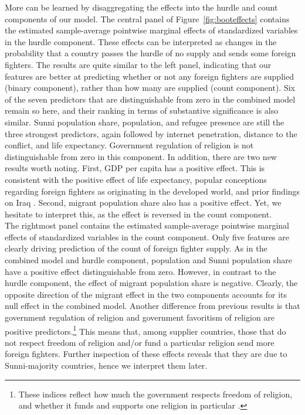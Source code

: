 \documentclass[12pt]{article}
\begin{document}
More can be learned by disaggregating the effects into the hurdle and count components of our model. The central panel of Figure~\ref{fig:booteffects} contains the estimated sample-average pointwise marginal effects of standardized variables in the hurdle component. These effects can be interpreted as changes in the probability that a country passes the hurdle of no supply and sends some foreign fighters. The results are quite similar to the left panel, indicating that our features are better at predicting whether or not any foreign fighters are supplied (binary component), rather than how many are supplied (count component). Six of the seven predictors that are distinguishable from zero in the combined model remain so here, and their ranking in terms of substantive significance is also similar. Sunni population share, population, and refugee presence are still the three strongest predictors, again followed by internet penetration, distance to the conflict, and life expectancy. Government regulation of religion is not distinguishable from zero in this component. In addition, there are two new results worth noting. First, GDP per capita has a positive effect. This is consistent with the positive effect of life expectancy, popular conceptions regarding foreign fighters as originating in the developed world, and prior findings on Iraq \citep{Hewitt2009}. Second, migrant population share also has a positive effect. Yet, we hesitate to interpret this, as the effect is reversed in the count component. 	\\

The rightmost panel contains the estimated sample-average pointwise marginal effects of standardized variables in the count component. Only five features are clearly driving prediction of the count of foreign fighter supply. As in the combined model and hurdle component, population and Sunni population share have a positive effect distinguishable from zero. However, in contrast to the hurdle component, the effect of migrant population share is negative. Clearly, the opposite direction of the migrant effect in the two components accounts for its null effect in the combined model. Another difference from previous results is that government regulation of religion and government favoritism of religion are positive predictors.\footnote{These indices reflect how much the government respects freedom of religion, and whether it funds and supports one religion in particular \citep{Grim2006}.} This means that, among supplier countries, those that do not respect freedom of religion and/or fund a particular religion send more foreign fighters. Further inspection of these effects reveals that they are due to Sunni-majority countries, hence we interpret them later.	\\
\end{document}
